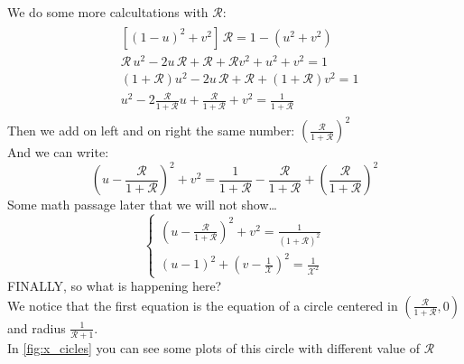 We do some more calcultations with $\mathcal{R}$:
\begin{align}
    \begin{split}
        &[(1-u)^2+v^2]\,\mathcal{R}=1-(u^2+v^2)\\[5pt]
        &\mathcal{R}\, u^2 -2 u\, \mathcal{R} + \mathcal{R} + \mathcal{R} v^2 +u^2+v^2=1\\[5pt]
        &(1+\mathcal{R})u^2-2u\,\mathcal{R}+\mathcal{R}+(1+\mathcal{R})v^2=1\\[5pt]
        &u^2-2\frac{\mathcal{R}}{1+\mathcal{R}}u+\frac{\mathcal{R}}{1+\mathcal{R}}+v^2=\frac{1}{1+\mathcal{R}}
    \end{split}
\end{align}
Then we add on left and on right the same number: $\left(\frac{\mathcal{R}}{1+\mathcal{R}}\right)^2$\\
And we can write:
\begin{equation}
    \left(u-\frac{\mathcal{R}}{1+\mathcal{R}}\right)^2+v^2=\frac{1}{1+\mathcal{R}} - \frac{\mathcal{R}}{1+\mathcal{R}}+\left(\frac{\mathcal{R}}{1+\mathcal{R}}\right)^2
\end{equation}
Some math passage later that we will not show\dots
\begin{equation}
    \begin{cases}
        \left(u-\frac{\mathcal{R}}{1+\mathcal{R}}\right)^2+v^2 =\frac{1}{(1+\mathcal{R})^2}\\
        (u-1)^2+\left(v-\frac{1}{\mathcal{X}}\right)^2=\frac{1}{\mathcal{X}^2}
    \end{cases}
\end{equation}
FINALLY, so what is happening here?\\
We notice that the first equation is the equation of a circle centered in $\left(\frac{\mathcal{R}}{1+\mathcal{R}},0\right)$ and radius $\frac{1}{\mathcal{R}+1}$.\\
In \cref{fig:x_cicles} you can see some plots of this circle with different value of $\mathcal{R}$
